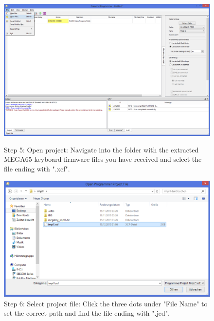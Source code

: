 \begin{figure}[H]
  \centering
  \includegraphics[width=0.8\linewidth]{images/diamond05.png}
  \captionsetup{width=0.8\linewidth}
  \caption{Step 5: Open project:
           Navigate into the folder with the extracted MEGA65 keyboard
           firmware files you have received and select the file ending with ".xcf".}
  \label{fig:diamond05}

\vspace{5mm}

  \includegraphics[width=0.8\linewidth]{images/diamond06.png}
  \captionsetup{width=0.8\linewidth}
  \caption{Step 6: Select project file:
           Click the three dots under "File Name" to set the correct
           path and find the file ending with ".jed".}
  \label{fig:diamond06}
\end{figure}


